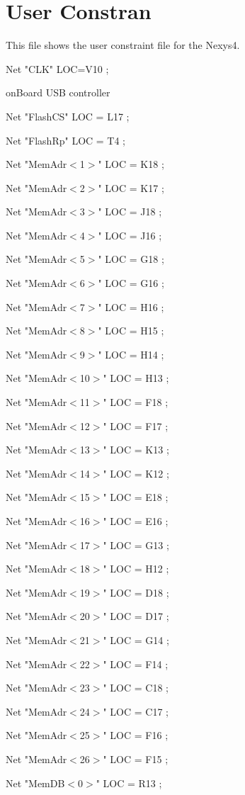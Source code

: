 \chapter{User Constran}\label{ch:ucffile}

This file shows the user constraint file for the Nexys4.

Net "CLK" LOC=V10 ;

 onBoard USB controller

Net "FlashCS" 
LOC = L17 ; 

Net "FlashRp" 
LOC = T4 ; 


Net "MemAdr$<$1$>$" 
LOC = K18  ;

Net "MemAdr$<$2$>$" 
LOC = K17  ;

Net "MemAdr$<$3$>$" 
LOC = J18  ; 

Net "MemAdr$<$4$>$" 
LOC = J16  ; 

Net "MemAdr$<$5$>$" 
LOC = G18  ; 

Net "MemAdr$<$6$>$" 
LOC = G16  ; 

Net "MemAdr$<$7$>$" 
LOC = H16  ; 

Net "MemAdr$<$8$>$" 
LOC = H15  ; 

Net "MemAdr$<$9$>$" 
LOC = H14  ; 

Net "MemAdr$<$10$>$" 
LOC = H13 ; 

Net "MemAdr$<$11$>$" 
LOC = F18 ; 

Net "MemAdr$<$12$>$" 
LOC = F17 ; 

Net "MemAdr$<$13$>$" 
LOC = K13 ; 

Net "MemAdr$<$14$>$" 
LOC = K12 ; 

Net "MemAdr$<$15$>$" 
LOC = E18 ; 

Net "MemAdr$<$16$>$" 
LOC = E16 ; 

Net "MemAdr$<$17$>$" 
LOC = G13 ; 

Net "MemAdr$<$18$>$" 
LOC = H12 ; 

Net "MemAdr$<$19$>$" 
LOC = D18 ; 

Net "MemAdr$<$20$>$" 
LOC = D17 ; 

Net "MemAdr$<$21$>$" 
LOC = G14 ; 

Net "MemAdr$<$22$>$" 
LOC = F14 ; 

Net "MemAdr$<$23$>$" 
LOC = C18 ; 

Net "MemAdr$<$24$>$" 
LOC = C17 ; 

Net "MemAdr$<$25$>$" 
LOC = F16 ; 

Net "MemAdr$<$26$>$" 
LOC = F15 ; 


Net "MemDB$<$0$>$" 
LOC = R13 ; 


